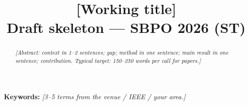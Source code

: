 \documentclass[11pt,a4paper]{article}
\title{\textbf{[Working title]}\\[0.35em]\large Draft skeleton --- SBPO 2026 (ST)}
\date{}
\begin{document}
\maketitle

\begin{abstract}
\textit{[Abstract: context in 1--2 sentences; gap; method in one sentence; main result in one sentence; contribution. Typical target: 150--250 words per call for papers.]}
\end{abstract}

\noindent\textbf{Keywords:}
\textit{[3--5 terms from the venue / IEEE / your area.]}

\tableofcontents
\newpage



% 
% 
\end{document}
